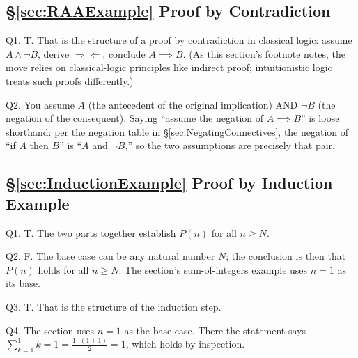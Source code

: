 \subsection*{\S\ref{sec:RAAExample} Proof by Contradiction}
\hypertarget{a:ch0:contra}{}
\noindent Q1. T. That is the structure of a proof by contradiction in classical logic: assume $A \land \lnot B$, derive $\Rightarrow \Leftarrow$, conclude $A \implies B$. (As this section's footnote notes, the move relies on classical-logic principles like indirect proof; intuitionistic logic treats such proofs differently.)\par\smallskip
\noindent Q2. You assume $A$ (the antecedent of the original implication) AND $\lnot B$ (the negation of the consequent). Saying ``assume the negation of $A \implies B$'' is loose shorthand: per the negation table in \S\ref{sec:NegatingConnectives}, the negation of ``if $A$ then $B$'' is ``$A$ and $\lnot B$,'' so the two assumptions are precisely that pair.\par\smallskip
\hfill{}\par\medskip

\subsection*{\S\ref{sec:InductionExample} Proof by Induction Example}
\hypertarget{a:ch0:induction}{}
\noindent Q1. T. The two parts together establish $P(n)$ for all $n \geq N$.\par\smallskip
\noindent Q2. F. The base case can be any natural number $N$; the conclusion is then that $P(n)$ holds for all $n \geq N$. The section's sum-of-integers example uses $n = 1$ as its base.\par\smallskip
\noindent Q3. T. That is the structure of the induction step.\par\smallskip
\noindent Q4. The section uses $n = 1$ as the base case. There the statement says $\sum_{k=1}^1 k = 1 = \tfrac{1 \cdot (1+1)}{2} = 1$, which holds by inspection.\par\smallskip
\hfill{}\par\medskip

